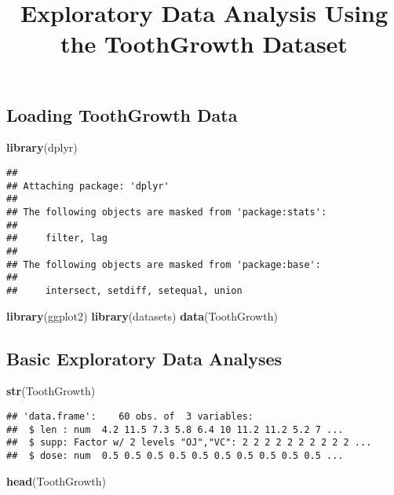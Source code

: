 \documentclass[]{article}
\title{Exploratory Data Analysis Using the ToothGrowth Dataset}
\author{}
\date{}
\newenvironment{Shaded}{\begin{snugshade}}{\end{snugshade}}
\newcommand{\KeywordTok}[1]{\textcolor[rgb]{0.13,0.29,0.53}{\textbf{{#1}}}}
\newcommand{\NormalTok}[1]{{#1}}
\begin{document}
\maketitle

\subsection{Loading ToothGrowth Data}\label{loading-toothgrowth-data}

\begin{Shaded}
\begin{Highlighting}[]
\KeywordTok{library}\NormalTok{(dplyr)}
\end{Highlighting}
\end{Shaded}

\begin{verbatim}
## 
## Attaching package: 'dplyr'
## 
## The following objects are masked from 'package:stats':
## 
##     filter, lag
## 
## The following objects are masked from 'package:base':
## 
##     intersect, setdiff, setequal, union
\end{verbatim}

\begin{Shaded}
\begin{Highlighting}[]
\KeywordTok{library}\NormalTok{(ggplot2)}
\KeywordTok{library}\NormalTok{(datasets)}
\KeywordTok{data}\NormalTok{(ToothGrowth)}
\end{Highlighting}
\end{Shaded}

\subsection{Basic Exploratory Data
Analyses}\label{basic-exploratory-data-analyses}

\begin{Shaded}
\begin{Highlighting}[]
\KeywordTok{str}\NormalTok{(ToothGrowth)}
\end{Highlighting}
\end{Shaded}

\begin{verbatim}
## 'data.frame':    60 obs. of  3 variables:
##  $ len : num  4.2 11.5 7.3 5.8 6.4 10 11.2 11.2 5.2 7 ...
##  $ supp: Factor w/ 2 levels "OJ","VC": 2 2 2 2 2 2 2 2 2 2 ...
##  $ dose: num  0.5 0.5 0.5 0.5 0.5 0.5 0.5 0.5 0.5 0.5 ...
\end{verbatim}

\begin{Shaded}
\begin{Highlighting}[]
\KeywordTok{head}\NormalTok{(ToothGrowth)}
\end{Highlighting}
\end{Shaded}
\end{document}
